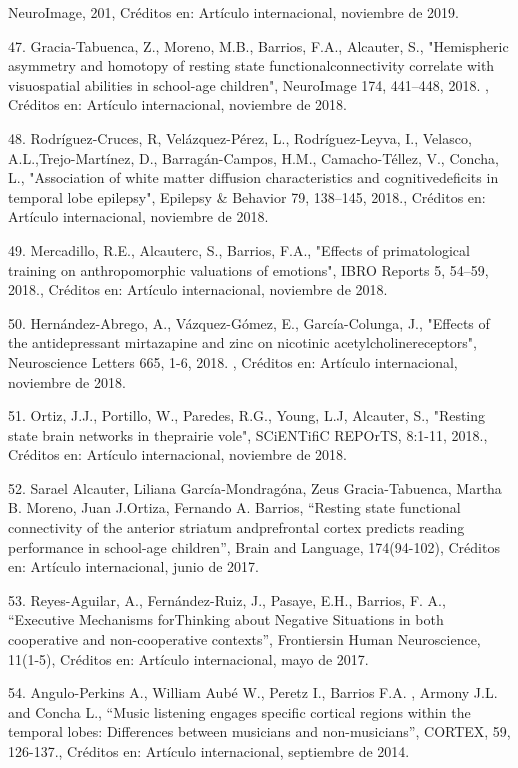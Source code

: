 NeuroImage, 201, Créditos en: Artículo internacional, noviembre de 2019.

47. Gracia-Tabuenca, Z., Moreno, M.B., Barrios, F.A., Alcauter, S., "Hemispheric asymmetry and homotopy of resting state 
functionalconnectivity correlate with visuospatial abilities in school-age children", NeuroImage 174, 441–448, 2018. , Créditos 
en: Artículo internacional, noviembre de 2018.

48. Rodríguez-Cruces, R, Velázquez-Pérez, L., Rodríguez-Leyva, I., Velasco, A.L.,Trejo-Martínez, D., Barragán-Campos, H.M., 
Camacho-Téllez, V., Concha, L., "Association of white matter diffusion characteristics and cognitivedeficits in temporal lobe 
epilepsy", Epilepsy & Behavior 79, 138–145, 2018., Créditos en: Artículo internacional, noviembre de 2018.

49. Mercadillo, R.E., Alcauterc, S., Barrios, F.A., "Effects of primatological training on anthropomorphic valuations of 
emotions", IBRO Reports 5, 54–59, 2018., Créditos en: Artículo internacional, noviembre de 2018.

50. Hernández-Abrego, A., Vázquez-Gómez, E., García-Colunga, J., "Effects of the antidepressant mirtazapine and zinc on 
nicotinic acetylcholinereceptors", Neuroscience Letters 665, 1-6, 2018. , Créditos en: Artículo internacional, noviembre de 
2018.

51. Ortiz, J.J., Portillo, W., Paredes, R.G., Young, L.J, Alcauter, S., "Resting state brain networks in theprairie vole", 
SCiENTifiC REPOrTS, 8:1-11, 2018., Créditos en: Artículo internacional, noviembre de 2018.

52. Sarael Alcauter, Liliana García-Mondragóna, Zeus Gracia-Tabuenca, Martha B. Moreno, Juan J.Ortiza, Fernando A. Barrios, 
“Resting state functional connectivity of the anterior striatum andprefrontal cortex predicts reading performance in school-age 
children”, Brain and Language, 174(94-102), Créditos en: Artículo internacional, junio de 2017.

53. Reyes-Aguilar, A., Fernández-Ruiz, J., Pasaye, E.H., Barrios, F. A., “Executive Mechanisms forThinking about Negative 
Situations in both cooperative and non-cooperative contexts”, Frontiersin Human Neuroscience, 11(1-5), Créditos en: Artículo 
internacional, mayo de 2017.

54. Angulo-Perkins A., William Aubé W., Peretz I., Barrios F.A. , Armony J.L. and Concha L., “Music listening engages specific 
cortical regions within the temporal lobes: Differences between musicians and non-musicians”, CORTEX, 59, 126-137., Créditos 
en: Artículo internacional, septiembre de 2014.

